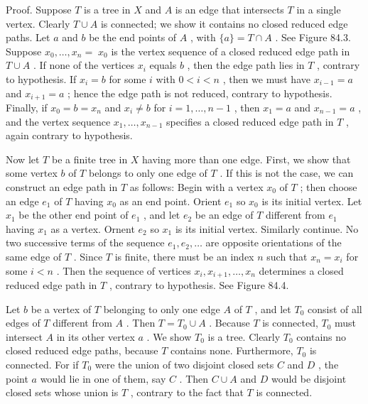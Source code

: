 \documentclass[10pt]{article}
\begin{document}
Proof. Suppose \(T\) is a tree in \(X\) and \(A\) is an edge that intersects \(T\) in a single vertex. Clearly \(T \cup  A\) is connected; we show it contains no closed reduced edge paths. Let \(a\) and \(b\) be the end points of \(A\) , with \(\{ a\}  = T \cap  A\) . See Figure 84.3. Suppose \({x}_{0},\ldots ,{x}_{n} = \; {x}_{0}\) is the vertex sequence of a closed reduced edge path in \(T \cup  A\) . If none of the vertices \({x}_{i}\) equals \(b\) , then the edge path lies in \(T\) , contrary to hypothesis. If \({x}_{i} = b\) for some \(i\) with \(0 < i < n\) , then we must have \({x}_{i - 1} = a\) and \({x}_{i + 1} = a\) ; hence the edge path is not reduced, contrary to hypothesis. Finally, if \({x}_{0} = b = {x}_{n}\) and \({x}_{i} \neq  b\) for \(i = 1,\ldots ,n - 1\) , then \({x}_{1} = a\) and \({x}_{n - 1} = a\) , and the vertex sequence \({x}_{1},\ldots ,{x}_{n - 1}\) specifies a closed reduced edge path in \(T\) , again contrary to hypothesis.

Now let \(T\) be a finite tree in \(X\) having more than one edge. First, we show that some vertex \(b\) of \(T\) belongs to only one edge of \(T\) . If this is not the case, we can construct an edge path in \(T\) as follows: Begin with a vertex \({x}_{0}\) of \(T\) ; then choose an edge \({e}_{1}\) of \(T\) having \({x}_{0}\) as an end point. Orient \({e}_{1}\) so \({x}_{0}\) is its initial vertex. Let \({x}_{1}\) be the other end point of \({e}_{1}\) , and let \({e}_{2}\) be an edge of \(T\) different from \({e}_{1}\) having \({x}_{1}\) as a vertex. Ornent \({e}_{2}\) so \({x}_{1}\) is its initial vertex. Similarly continue. No two successive terms of the sequence \({e}_{1},{e}_{2},\ldots\) are opposite orientations of the same edge of \(T\) . Since \(T\) is finite, there must be an index \(n\) such that \({x}_{n} = {x}_{i}\) for some \(i < n\) . Then the sequence of vertices \({x}_{i},{x}_{i + 1},\ldots ,{x}_{n}\) determines a closed reduced edge path in \(T\) , contrary to hypothesis. See Figure 84.4.

Let \(b\) be a vertex of \(T\) belonging to only one edge \(A\) of \(T\) , and let \({T}_{0}\) consist of all edges of \(T\) different from \(A\) . Then \(T = {T}_{0} \cup  A\) . Because \(T\) is connected, \({T}_{0}\) must intersect \(A\) in its other vertex \(a\) . We show \({T}_{0}\) is a tree. Clearly \({T}_{0}\) contains no closed reduced edge paths, because \(T\) contains none. Furthermore, \({T}_{0}\) is connected. For if \({T}_{0}\) were the union of two disjoint closed sets \(C\) and \(D\) , the point \(a\) would lie in one of them, say \(C\) . Then \(C \cup  A\) and \(D\) would be disjoint closed sets whose union is \(T\) , contrary to the fact that \(T\) is connected.
\end{document}
